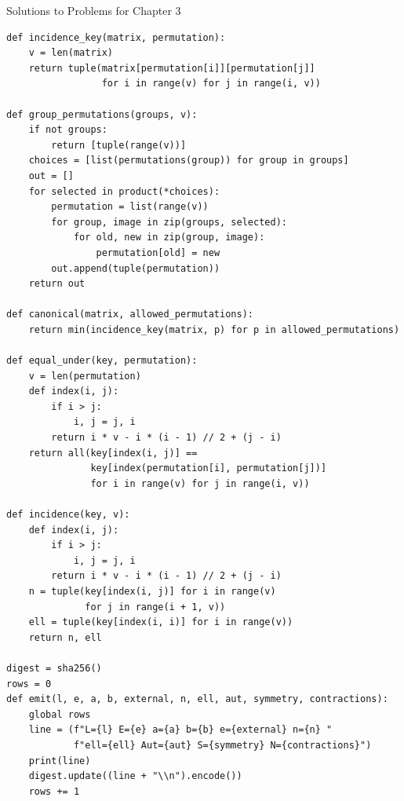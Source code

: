 \begin{bankssolutions}{Solutions to Problems for Chapter 3}
\begin{verbatim}
def incidence_key(matrix, permutation):
    v = len(matrix)
    return tuple(matrix[permutation[i]][permutation[j]]
                 for i in range(v) for j in range(i, v))

def group_permutations(groups, v):
    if not groups:
        return [tuple(range(v))]
    choices = [list(permutations(group)) for group in groups]
    out = []
    for selected in product(*choices):
        permutation = list(range(v))
        for group, image in zip(groups, selected):
            for old, new in zip(group, image):
                permutation[old] = new
        out.append(tuple(permutation))
    return out

def canonical(matrix, allowed_permutations):
    return min(incidence_key(matrix, p) for p in allowed_permutations)

def equal_under(key, permutation):
    v = len(permutation)
    def index(i, j):
        if i > j:
            i, j = j, i
        return i * v - i * (i - 1) // 2 + (j - i)
    return all(key[index(i, j)] ==
               key[index(permutation[i], permutation[j])]
               for i in range(v) for j in range(i, v))

def incidence(key, v):
    def index(i, j):
        if i > j:
            i, j = j, i
        return i * v - i * (i - 1) // 2 + (j - i)
    n = tuple(key[index(i, j)] for i in range(v)
              for j in range(i + 1, v))
    ell = tuple(key[index(i, i)] for i in range(v))
    return n, ell

digest = sha256()
rows = 0
def emit(l, e, a, b, external, n, ell, aut, symmetry, contractions):
    global rows
    line = (f"L={l} E={e} a={a} b={b} e={external} n={n} "
            f"ell={ell} Aut={aut} S={symmetry} N={contractions}")
    print(line)
    digest.update((line + "\\n").encode())
    rows += 1


\end{verbatim}
\end{bankssolutions}
